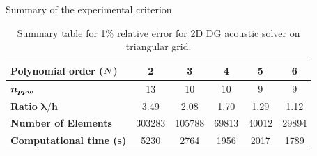 
\begin{frame}{Summary of the experimental criterion}
  \small
      \hspace{-1cm}
  \begin{table}[!htbp]
    \begin{tabular}{|l|c|c|c|c|c|}
    \hline
        \textbf{Polynomial order (${N}$)} & 2 & 3 & 4 & 5 & 6 \\ \hline
        $\boldsymbol{n_{ppw}}$  & 13 & 10 & 10 & 9 & 9 \\ \hline
        \textbf{Ratio} $\boldsymbol{\lambda/h}$ & 3.49 & 2.08 & 1.70 & 1.29 & 1.12 \\ \hline
        \textbf{Number of Elements} & 303283 & 105788 & 69813 & 40012 & 29894 \\ \hline
        \textbf{Computational time (s)} & 5230 & 2764 & 1956 & 2017  & 1789\\ \hline
    \end{tabular}
    \caption*{Summary table for 1$\%$ relative error for 2D DG acoustic solver on triangular grid.}
    \label{recap_ppw}
  \end{table}
\end{frame}







